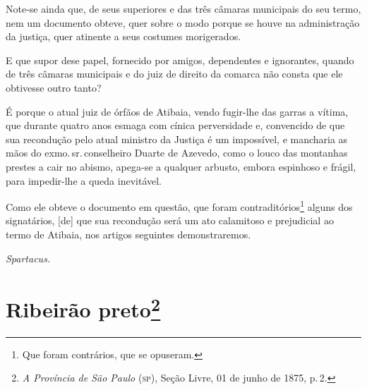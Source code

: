 Note-se ainda que, de seus superiores e das três câmaras municipais do
seu termo, nem um documento obteve, quer sobre o modo porque se houve na
administração da justiça, quer atinente a seus costumes morigerados.

E que supor dese papel, fornecido por amigos, dependentes e ignorantes,
quando de três câmaras municipais e do juiz de direito da comarca não
consta que ele obtivesse outro tanto?

É porque o atual juiz de órfãos de Atibaia, vendo fugir-lhe das garras a
vítima, que durante quatro anos esmaga com cínica perversidade e,
convencido de que sua recondução pelo atual ministro da Justiça é um
impossível, e mancharia as mãos do exmo.\,sr.\,conselheiro Duarte de
Azevedo, como o louco das montanhas prestes a cair no abismo, apega-se a
qualquer arbusto, embora espinhoso e frágil, para impedir-lhe a queda
inevitável.

Como ele obteve o documento em questão, que foram
contraditórios\footnote{ Que foram contrários, que se opuseram.} alguns
dos signatários, {[}de{]} que sua recondução será um ato calamitoso e
prejudicial ao termo de Atibaia, nos artigos seguintes demonstraremos.

\emph{Spartacus.}

\chapter{Ribeirão preto\footnote{\emph{A Província de São Paulo} (\textsc{sp}), Seção Livre,
  01 de junho de 1875, p.\,2.}} %

